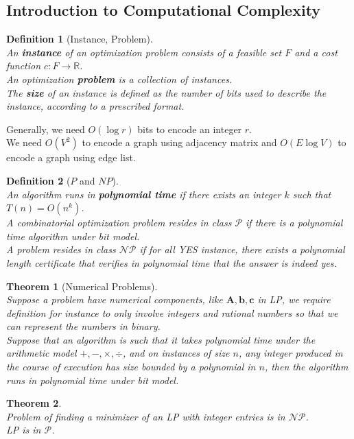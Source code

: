 \documentclass[12pt]{article}
\newtheorem{definition}{Definition}[section]
\newtheorem{theorem}{Theorem}[section]
\theoremstyle{definition}
\begin{document}
\subsection{Introduction to Computational Complexity}
\begin{definition}[Instance, Problem]
\hfill\\\normalfont An \textbf{instance} of an optimization problem consists of a feasible set $F$ and a cost function $c:F\to\mathbb{R}$.\\
An optimization \textbf{problem} is a collection of instances.\\
The \textbf{size} of an instance is defined as the number of bits used to describe the instance, according to a prescribed format.
\end{definition}
Generally, we need $O(\log r)$ bits to encode an integer $r$.\\
We need $O(V^2)$ to encode a graph using adjacency matrix and $O(E\log V)$ to encode a graph using edge list.
\begin{definition}[{$P$} and {$NP$}]
\hfill\\\normalfont An algorithm runs in \textbf{polynomial time} if there exists an integer $k$ such that $T(n)=O(n^k)$.\\
A combinatorial optimization problem resides in class $\mathcal{P}$ if there is a polynomial time algorithm under bit model.\\
A problem resides in class $\mathcal{NP}$ if for all YES instance, there exists a polynomial length certificate that verifies in polynomial time that the answer is indeed yes.
\end{definition}
\begin{theorem}[Numerical Problems]
\hfill\\\normalfont Suppose a problem have numerical components, like $\mathbf{A},\mathbf{b},\mathbf{c}$ in LP, we require definition for instance to only involve integers and rational numbers so that we can represent the numbers in binary.\\
Suppose that an algorithm is such that it takes polynomial time under the arithmetic model $+,-,\times,\div$, and on instances of size $n$, any integer produced in the course of execution has size bounded by a polynomial in $n$, then the algorithm runs in polynomial time under bit model.
\end{theorem}
\begin{theorem}
\hfill\\\normalfont Problem of finding a minimizer of an LP with integer entries is in $\mathcal{NP}$.\\
LP is in $\mathcal{P}$.
\end{theorem}
\end{document}
